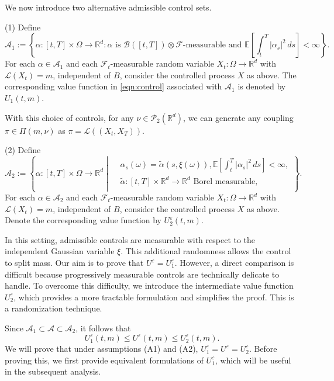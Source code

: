 \documentclass[reqno,11pt]{amsart}
\numberwithin{equation}{section}
\newcommand{\R}{\mathbb{R}} %
\newcommand{\e}{\varepsilon}
\newcommand{\ep}{\varepsilon}
\newcommand{\nd}{\noindent}
\begin{document}

We now introduce two alternative admissible control sets.

\nd
(1) Define \[
\mathcal{A}_1:=\left\{\alpha:[t,T]\times \Omega\rightarrow \mathbb{R}^d: \alpha \text{ is } \mathcal{B}([t,T])\otimes \mathcal{F} \text{-measurable and } \mathbb{E}\left[ \int_t^T|\alpha_s|^2 \,ds \right] <\infty\right\}.\]
For each $\alpha \in \mathcal{A}_1$ and each $\mathcal{F}_t$-measurable random variable
$X_t : \Omega \to \mathbb{R}^d$ with $\mathcal{L}(X_t)=m$, independent of $B$,
consider the controlled process $X$ as above. The corresponding value function in \eqref{eqn:control} associated with $\mathcal{A}_1$
is denoted by $U_1(t,m)$.

With this choice of controls, for any $\nu\in\mathcal{P}_2(\R^d)$, we can generate any coupling $\pi\in \Pi(m,\nu)$ as $\pi=\mathcal{L}((X_t,X_T))$.


\nd
(2) Define
\[
\mathcal{A}_2
:=
\left\{
\alpha : [t,T]\times \Omega \to \mathbb{R}^d \;\left|\;
\begin{aligned}
&\alpha_s(\omega)
= \tilde{\alpha}\left(s,\xi(\omega)\right),\mathbb{E}\left[\int_t^T \lvert \alpha_s\rvert^2 \,ds \right] < \infty, \\
&\tilde{\alpha} : [t,T]\times \mathbb{R}^d \to \mathbb{R}^d
\text{ Borel measurable}, \\
\end{aligned}
\right.
\right\}.
\]
For each $\alpha \in \mathcal{A}_2$ and each $\mathcal{F}_t$-measurable random variable
$X_t : \Omega \to \mathbb{R}^d$ with $\mathcal{L}(X_t)=m$, independent of $B$,
consider the controlled process $X$ as above. Denote the corresponding value function by $U^\e_2(t,m)$.

In this setting, admissible controls are measurable with respect to the independent Gaussian variable $\xi$. This additional randomness allows the control to split mass. Our aim is to prove that $U^\varepsilon = U_1^\varepsilon$. However, a direct comparison is difficult because progressively measurable controls are technically delicate to handle. To overcome this difficulty, we introduce the intermediate value function $U_2^\varepsilon$, which provides a more tractable formulation and simplifies the proof. This is a randomization technique.


Since $\mathcal{A}_1 \subset \mathcal{A} \subset\mathcal{A}_2$, it follows that
\[
U^\ep_1(t,m) \leq U^\ep(t,m) \leq U^\ep_2(t,m).
\]
We will prove that under assumptions (A1) and (A2), $U_1^\ep=U^\ep=U_2^\ep$. Before proving this, we first provide equivalent formulations of $U_1^\varepsilon$, which will be useful in the subsequent analysis.
\end{document}
